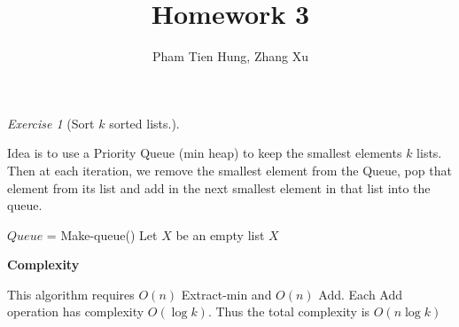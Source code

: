 \documentclass[a4paper,10pt,twoside]{article}
\title{Homework 3}
\author{Pham Tien Hung, Zhang Xu}
\date{}
\theoremstyle{plain}
\theoremstyle{definition}
\theoremstyle{remark}
\newtheorem{exercise}{Exercise}
\begin{document}
\maketitle
\listoftodos
\begin{exercise}[Sort $k$ sorted lists.]\

Idea is to use a Priority Queue (min heap) to keep the smallest
elements $k$ lists. Then at each iteration, we remove the smallest
element from the Queue, pop that element from its list and add in
the next smallest element in that list into the queue.
\begin{algorithm}[h]
	\caption{Sort $k$ sorted lists ($L[1...k][:]$)}
	$Queue$ = Make-queue()\;
	Let $X$ be an empty list\;
	\Return $X$\;
\end{algorithm}

\textbf{Complexity}

This algorithm requires $O(n)$ Extract-min and $O(n)$ Add. Each Add 
operation has complexity $O(\log k)$. Thus the total complexity is
$O(n \log k)$


\end{exercise}
\end{document}
